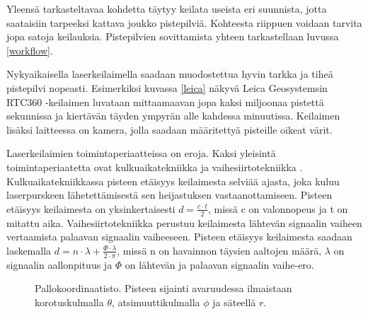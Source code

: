 Yleensä tarkasteltavaa kohdetta täytyy keilata useista eri suunnista, jotta saataisiin tarpeeksi kattava joukko pistepilviä. Kohteesta riippuen voidaan tarvita jopa satoja keilauksia. Pistepilvien sovittamista yhteen tarkastellaan luvussa \ref{workflow}.

Nykyaikaisella laserkeilaimella saadaan muodostettua hyvin tarkka ja tiheä pistepilvi nopeasti. Esimerkiksi kuvassa \ref{leica} näkyvä Leica Geosystemsin RTC360 -keilaimen luvataan mittaamaavan jopa kaksi miljoonaa pistettä sekunnissa ja kiertävän täyden ympyrän alle kahdessa minuutissa. Keilaimen lisäksi laitteessa on kamera, jolla saadaan määritettyä pisteille oikeat värit. \cite{leica} 

Laserkeilaimien toimintaperiaatteissa on eroja. Kaksi yleisintä toimintaperiaatetta ovat kulkuaikatekniikka  ja vaihesiirtotekniikka . Kulkuaikatekniikkassa pisteen etäisyys keilaimesta selviää ajasta, joka kuluu laserpurskeen lähetettämisestä sen heijastuksen vastaanottamiseen. Pisteen etäisyys keilaimesta on yksinkertaisesti $d=\frac{c\cdot t}{2}$, missä c on valonnopeus ja t on mitattu aika. \cite{fabritius}   
Vaihesiirtotekniikka perustuu keilaimesta lähtevän signaalin vaiheen vertaamista palaavan signaalin vaiheeseen. Pisteen etäisyys keilaimesta saadaan laskemalla $d=n\cdot \lambda + \frac{\Phi \cdot \lambda}{2 \cdot \pi}$, missä n on havainnon täysien aaltojen määrä, $\lambda$ on signaalin aallonpituus ja $\Phi$ on lähtevän ja palaavan signaalin vaihe-ero. \cite{fabritius}

\begin{figure}
    \centering
    
    \caption{Pallokoordinaatisto. Pisteen sijainti avaruudessa ilmaistaan korotuskulmalla $\theta$, atsimuuttikulmalla $\phi$ ja säteellä $r$.}
    \label{pallo}
\end{figure}{}

